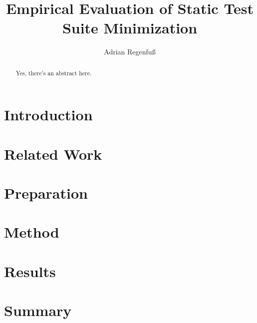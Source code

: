 \documentclass[a4paper,10pt]{article}
\title{Empirical Evaluation of Static Test Suite Minimization}
\author{Adrian Regenfuß}
\begin{document}
\maketitle


\begin{abstract}
Yes, there's an abstract here.
\end{abstract}

\section{Introduction}

\section{Related Work}

\section{Preparation}

\section{Method}

\section{Results}

\section{Summary}



\end{document}
